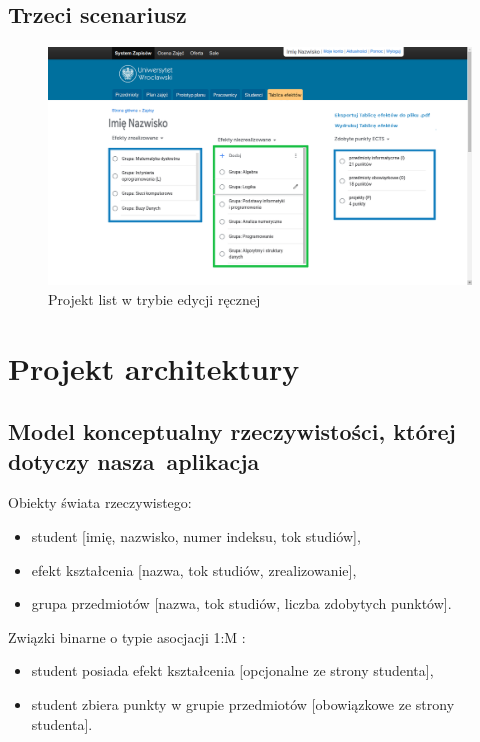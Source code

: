 \documentclass{article}
\begin{document}
\subsection{Trzeci scenariusz}
\begin{figure}[H]
	\begin{center}
		\caption{Projekt list w trybie edycji ręcznej}
		\includegraphics[scale=0.23]{edycja.png}
	\end{center}
\end{figure}


\section{Projekt architektury}

\subsection{Model konceptualny rzeczywistości, której dotyczy nasza~aplikacja}
Obiekty świata rzeczywistego:
\begin{itemize}
 \item student [imię, nazwisko, numer indeksu, tok studiów],
 \item efekt kształcenia [nazwa, tok studiów, zrealizowanie],
 \item grupa przedmiotów [nazwa, tok studiów, liczba zdobytych punktów].
\end{itemize}
Związki binarne o typie asocjacji 1:M :
\begin{itemize}
 \item student posiada efekt kształcenia [opcjonalne ze strony studenta],
 \item student zbiera punkty w grupie przedmiotów [obowiązkowe ze strony studenta].
\end{itemize}
\end{document}
